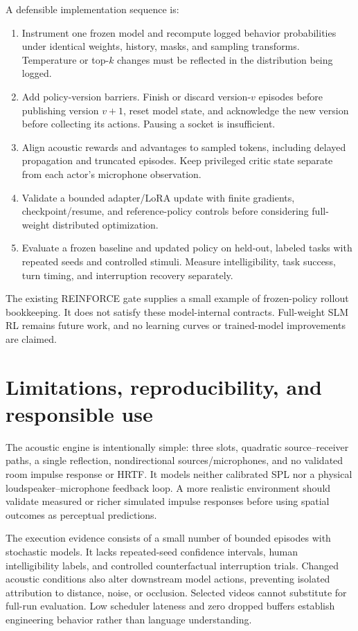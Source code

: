 \documentclass{article}
\begin{document}
A defensible implementation sequence is:
\begin{enumerate}
\item Instrument one frozen model and recompute logged behavior probabilities under identical weights, history, masks, and sampling transforms. Temperature or top-$k$ changes must be reflected in the distribution being logged.
\item Add policy-version barriers. Finish or discard version-$v$ episodes before publishing version $v+1$, reset model state, and acknowledge the new version before collecting its actions. Pausing a socket is insufficient.
\item Align acoustic rewards and advantages to sampled tokens, including delayed propagation and truncated episodes. Keep privileged critic state separate from each actor's microphone observation.
\item Validate a bounded adapter/LoRA update with finite gradients, checkpoint/resume, and reference-policy controls before considering full-weight distributed optimization.
\item Evaluate a frozen baseline and updated policy on held-out, labeled tasks with repeated seeds and controlled stimuli. Measure intelligibility, task success, turn timing, and interruption recovery separately.
\end{enumerate}
The existing REINFORCE gate supplies a small example of frozen-policy rollout bookkeeping. It does not satisfy these model-internal contracts. Full-weight SLM RL remains future work, and no learning curves or trained-model improvements are claimed.

\section{Limitations, reproducibility, and responsible use}
The acoustic engine is intentionally simple: three slots, quadratic source--receiver paths, a single reflection, nondirectional sources/microphones, and no validated room impulse response or HRTF. It models neither calibrated SPL nor a physical loudspeaker--microphone feedback loop. A more realistic environment should validate measured or richer simulated impulse responses before using spatial outcomes as perceptual predictions.

The execution evidence consists of a small number of bounded episodes with stochastic models. It lacks repeated-seed confidence intervals, human intelligibility labels, and controlled counterfactual interruption trials. Changed acoustic conditions also alter downstream model actions, preventing isolated attribution to distance, noise, or occlusion. Selected videos cannot substitute for full-run evaluation. Low scheduler lateness and zero dropped buffers establish engineering behavior rather than language understanding.
\end{document}
